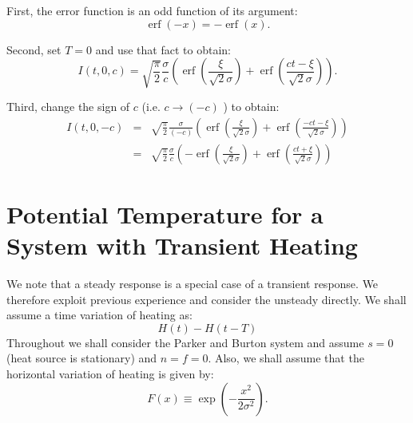 \documentclass[12pt]{article}
\DeclareMathOperator\erf {erf}
\begin{document}
First, the error function is an odd function of its argument:
%
\begin{equation}
\erf(-x) = - \erf(x).
\end{equation}

Second, set $T=0$ and use that fact to obtain:
%
\begin{equation}
I (t,0,c) = \sqrt{ \frac{\pi}{2} } \frac{ \sigma }{ c } \left(  \erf \left( \frac{\xi}{\sqrt{2} \sigma} \right) +  \erf \left( \frac{ct-\xi}{\sqrt{2} \sigma} \right)    \right) .
\end{equation}
%

Third, change the sign of $c$ (i.e. $c \rightarrow (-c) $ ) to obtain:
%
\begin{eqnarray}
\label{equ_property1}
I (t,0,-c) & = & \sqrt{ \frac{\pi}{2} } \frac{ \sigma }{(- c) }\left(  \erf \left( \frac{\xi}{\sqrt{2} \sigma} \right) + \erf \left( \frac{- ct-\xi}{\sqrt{2} \sigma} \right)    \right)  \\ \nonumber
& = &  \sqrt{ \frac{\pi}{2} } \frac{ \sigma }{ c }\left( -  \erf \left( \frac{\xi}{\sqrt{2} \sigma} \right) + \erf \left( \frac{ct+\xi}{\sqrt{2} \sigma} \right)    \right)
\end{eqnarray}
%
\section{Potential Temperature for a System with Transient Heating}
\label{sec_bresponse}
%
%
%
We note that a steady response is a special case of a transient response. We therefore exploit previous experience and consider the unsteady directly.
We shall assume a time variation of heating as:
%
\begin{equation}
 H(t) - H(t-T) 
\end{equation}
%
Throughout we shall consider the Parker and Burton system and assume $s=0$ (heat source is stationary) and $n=f=0$.
Also, we shall assume that the horizontal variation of heating is given by:
%
\begin{equation}
F(x) \equiv \exp \left( - \frac{x^2}{2 \sigma^2 } \right).
\end{equation}
%
%
%
\end{document}
